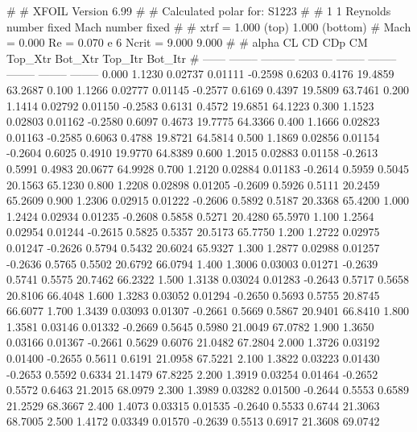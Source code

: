 #  
#       XFOIL         Version 6.99
#  
# Calculated polar for: S1223                                           
#  
# 1 1 Reynolds number fixed          Mach number fixed         
#  
# xtrf =   1.000 (top)        1.000 (bottom)  
# Mach =   0.000     Re =     0.070 e 6     Ncrit =   9.000  9.000
#  
#   alpha    CL        CD       CDp       CM     Top_Xtr  Bot_Xtr  Top_Itr  Bot_Itr
#  ------ -------- --------- --------- -------- -------- -------- -------- --------
   0.000   1.1230   0.02737   0.01111  -0.2598   0.6203   0.4176  19.4859  63.2687
   0.100   1.1266   0.02777   0.01145  -0.2577   0.6169   0.4397  19.5809  63.7461
   0.200   1.1414   0.02792   0.01150  -0.2583   0.6131   0.4572  19.6851  64.1223
   0.300   1.1523   0.02803   0.01162  -0.2580   0.6097   0.4673  19.7775  64.3366
   0.400   1.1666   0.02823   0.01163  -0.2585   0.6063   0.4788  19.8721  64.5814
   0.500   1.1869   0.02856   0.01154  -0.2604   0.6025   0.4910  19.9770  64.8389
   0.600   1.2015   0.02883   0.01158  -0.2613   0.5991   0.4983  20.0677  64.9928
   0.700   1.2120   0.02884   0.01183  -0.2614   0.5959   0.5045  20.1563  65.1230
   0.800   1.2208   0.02898   0.01205  -0.2609   0.5926   0.5111  20.2459  65.2609
   0.900   1.2306   0.02915   0.01222  -0.2606   0.5892   0.5187  20.3368  65.4200
   1.000   1.2424   0.02934   0.01235  -0.2608   0.5858   0.5271  20.4280  65.5970
   1.100   1.2564   0.02954   0.01244  -0.2615   0.5825   0.5357  20.5173  65.7750
   1.200   1.2722   0.02975   0.01247  -0.2626   0.5794   0.5432  20.6024  65.9327
   1.300   1.2877   0.02988   0.01257  -0.2636   0.5765   0.5502  20.6792  66.0794
   1.400   1.3006   0.03003   0.01271  -0.2639   0.5741   0.5575  20.7462  66.2322
   1.500   1.3138   0.03024   0.01283  -0.2643   0.5717   0.5658  20.8106  66.4048
   1.600   1.3283   0.03052   0.01294  -0.2650   0.5693   0.5755  20.8745  66.6077
   1.700   1.3439   0.03093   0.01307  -0.2661   0.5669   0.5867  20.9401  66.8410
   1.800   1.3581   0.03146   0.01332  -0.2669   0.5645   0.5980  21.0049  67.0782
   1.900   1.3650   0.03166   0.01367  -0.2661   0.5629   0.6076  21.0482  67.2804
   2.000   1.3726   0.03192   0.01400  -0.2655   0.5611   0.6191  21.0958  67.5221
   2.100   1.3822   0.03223   0.01430  -0.2653   0.5592   0.6334  21.1479  67.8225
   2.200   1.3919   0.03254   0.01464  -0.2652   0.5572   0.6463  21.2015  68.0979
   2.300   1.3989   0.03282   0.01500  -0.2644   0.5553   0.6589  21.2529  68.3667
   2.400   1.4073   0.03315   0.01535  -0.2640   0.5533   0.6744  21.3063  68.7005
   2.500   1.4172   0.03349   0.01570  -0.2639   0.5513   0.6917  21.3608  69.0742
